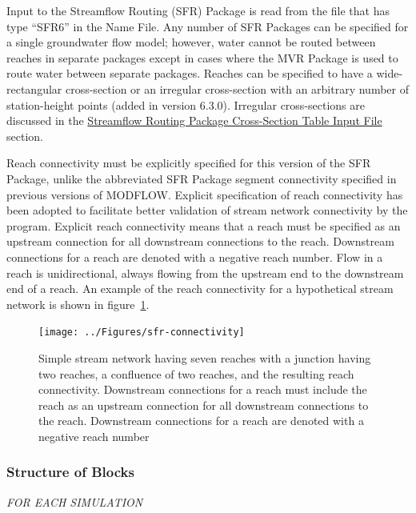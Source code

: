 Input to the Streamflow Routing (SFR) Package is read from the file that has type ``SFR6'' in the Name File. Any number of SFR Packages can be specified for a single groundwater flow model; however, water cannot be routed between reaches in separate packages except in cases where the MVR Package is used to route water between separate packages. Reaches can be specified to have a wide-rectangular cross-section or an irregular cross-section with an arbitrary number of station-height points (added in version 6.3.0). Irregular cross-sections are discussed in the \hyperref[sec:n-point]{Streamflow Routing Package Cross-Section Table Input File} section.

Reach connectivity must be explicitly specified for this version of the SFR Package, unlike the abbreviated SFR Package segment connectivity specified in previous versions of MODFLOW. Explicit specification of reach connectivity has been adopted to facilitate better validation of stream network connectivity by the program. Explicit reach connectivity means that a reach must be specified as an upstream connection for all downstream connections to the reach. Downstream connections for a reach are denoted with a negative reach number. Flow in a reach is unidirectional, always flowing from the upstream end to the downstream end of a reach. An example of the reach connectivity for a hypothetical stream network is shown in figure~\ref{fig:sfr-connectivity}.

\begin{figure}[ht]
	\centering
	\texttt{[image: ../Figures/sfr-connectivity]}
	\caption[Illustration of a simple stream network having seven reaches with a junction having two reaches, a confluence of two reaches, and the resulting reach connectivity]{Simple stream network having seven reaches with a junction having two reaches, a confluence of two reaches, and the resulting reach connectivity. Downstream connections for a reach must include the reach as an upstream connection for all downstream connections to the reach. Downstream connections for a  reach are denoted with a negative reach number}
	\label{fig:sfr-connectivity}
\end{figure}

\vspace{5mm}
\subsubsection{Structure of Blocks}

\vspace{5mm}
\noindent \textit{FOR EACH SIMULATION}




